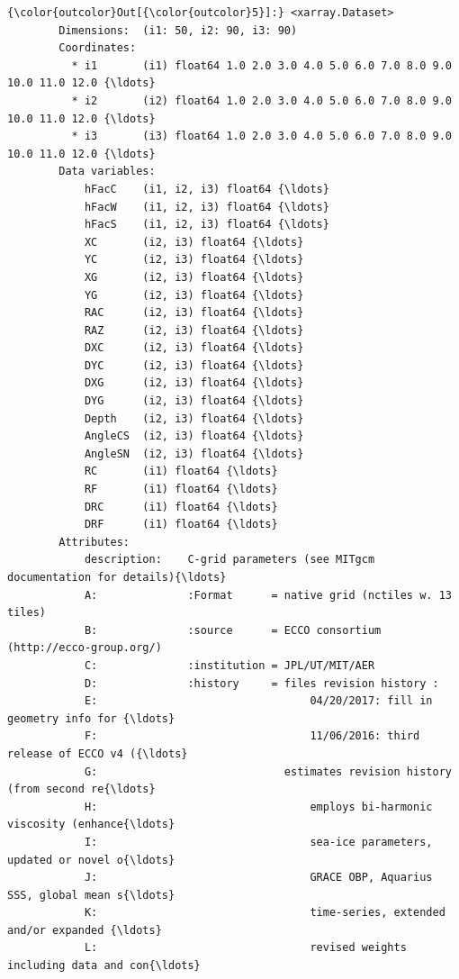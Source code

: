 \documentclass[11pt]{article}
\begin{document}
\begin{Verbatim}[commandchars=\\\{\}]
{\color{outcolor}Out[{\color{outcolor}5}]:} <xarray.Dataset>
        Dimensions:  (i1: 50, i2: 90, i3: 90)
        Coordinates:
          * i1       (i1) float64 1.0 2.0 3.0 4.0 5.0 6.0 7.0 8.0 9.0 10.0 11.0 12.0 {\ldots}
          * i2       (i2) float64 1.0 2.0 3.0 4.0 5.0 6.0 7.0 8.0 9.0 10.0 11.0 12.0 {\ldots}
          * i3       (i3) float64 1.0 2.0 3.0 4.0 5.0 6.0 7.0 8.0 9.0 10.0 11.0 12.0 {\ldots}
        Data variables:
            hFacC    (i1, i2, i3) float64 {\ldots}
            hFacW    (i1, i2, i3) float64 {\ldots}
            hFacS    (i1, i2, i3) float64 {\ldots}
            XC       (i2, i3) float64 {\ldots}
            YC       (i2, i3) float64 {\ldots}
            XG       (i2, i3) float64 {\ldots}
            YG       (i2, i3) float64 {\ldots}
            RAC      (i2, i3) float64 {\ldots}
            RAZ      (i2, i3) float64 {\ldots}
            DXC      (i2, i3) float64 {\ldots}
            DYC      (i2, i3) float64 {\ldots}
            DXG      (i2, i3) float64 {\ldots}
            DYG      (i2, i3) float64 {\ldots}
            Depth    (i2, i3) float64 {\ldots}
            AngleCS  (i2, i3) float64 {\ldots}
            AngleSN  (i2, i3) float64 {\ldots}
            RC       (i1) float64 {\ldots}
            RF       (i1) float64 {\ldots}
            DRC      (i1) float64 {\ldots}
            DRF      (i1) float64 {\ldots}
        Attributes:
            description:    C-grid parameters (see MITgcm documentation for details){\ldots}
            A:              :Format      = native grid (nctiles w. 13 tiles)
            B:              :source      = ECCO consortium (http://ecco-group.org/)
            C:              :institution = JPL/UT/MIT/AER
            D:              :history     = files revision history :
            E:                                 04/20/2017: fill in geometry info for {\ldots}
            F:                                 11/06/2016: third release of ECCO v4 ({\ldots}
            G:                             estimates revision history (from second re{\ldots}
            H:                                 employs bi-harmonic viscosity (enhance{\ldots}
            I:                                 sea-ice parameters, updated or novel o{\ldots}
            J:                                 GRACE OBP, Aquarius SSS, global mean s{\ldots}
            K:                                 time-series, extended and/or expanded {\ldots}
            L:                                 revised weights including data and con{\ldots}

\end{Verbatim}
\end{document}

